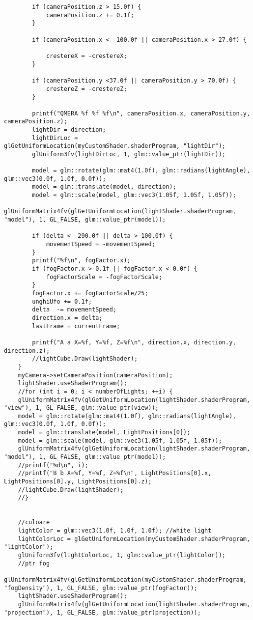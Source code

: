 \begin{itemize}
\begin{verbatim}
		if (cameraPosition.z > 15.0f) {
			cameraPosition.z += 0.1f;
		}
		
		if (cameraPosition.x < -100.0f || cameraPosition.x > 27.0f) {
			
			crestereX = -crestereX;
		}

		if (cameraPosition.y <37.0f || cameraPosition.y > 70.0f) {
			crestereZ = -crestereZ;
		}
		
		printf("QMERA %f %f %f\n", cameraPosition.x, cameraPosition.y, cameraPosition.z);
		lightDir = direction;
		lightDirLoc = glGetUniformLocation(myCustomShader.shaderProgram, "lightDir");
		glUniform3fv(lightDirLoc, 1, glm::value_ptr(lightDir));
	
		model = glm::rotate(glm::mat4(1.0f), glm::radians(lightAngle), glm::vec3(0.0f, 1.0f, 0.0f));
		model = glm::translate(model, direction);
		model = glm::scale(model, glm::vec3(1.05f, 1.05f, 1.05f));
		glUniformMatrix4fv(glGetUniformLocation(lightShader.shaderProgram, "model"), 1, GL_FALSE, glm::value_ptr(model));
		
		if (delta < -290.0f || delta > 100.0f) {
			movementSpeed = -movementSpeed;
		}
		printf("%f\n", fogFactor.x);
		if (fogFactor.x > 0.1f || fogFactor.x < 0.0f) {
			fogFactorScale = -fogFactorScale;
		}
		fogFactor.x += fogFactorScale/25;
		unghiUfo += 0.1f;
		delta  -= movementSpeed;
		direction.x = delta;
		lastFrame = currentFrame;

		printf("A a X=%f, Y=%f, Z=%f\n", direction.x, direction.y, direction.z);
		//lightCube.Draw(lightShader);
	}
	myCamera->setCameraPosition(cameraPosition);
	lightShader.useShaderProgram();
	//for (int i = 0; i < numberOfLights; ++i) {
	glUniformMatrix4fv(glGetUniformLocation(lightShader.shaderProgram, "view"), 1, GL_FALSE, glm::value_ptr(view));
	model = glm::rotate(glm::mat4(1.0f), glm::radians(lightAngle), glm::vec3(0.0f, 1.0f, 0.0f));
	model = glm::translate(model, LightPositions[0]);
	model = glm::scale(model, glm::vec3(1.05f, 1.05f, 1.05f));
	glUniformMatrix4fv(glGetUniformLocation(lightShader.shaderProgram, "model"), 1, GL_FALSE, glm::value_ptr(model));
	//printf("%d\n", i);
	//printf("B b X=%f, Y=%f, Z=%f\n", LightPositions[0].x, LightPositions[0].y, LightPositions[0].z);
	//lightCube.Draw(lightShader);
	//}


	//culoare
	lightColor = glm::vec3(1.0f, 1.0f, 1.0f); //white light
	lightColorLoc = glGetUniformLocation(myCustomShader.shaderProgram, "lightColor");
	glUniform3fv(lightColorLoc, 1, glm::value_ptr(lightColor));
	//ptr fog
	glUniformMatrix4fv(glGetUniformLocation(myCustomShader.shaderProgram, "fogDensity"), 1, GL_FALSE, glm::value_ptr(fogFactor));
	lightShader.useShaderProgram();
	glUniformMatrix4fv(glGetUniformLocation(lightShader.shaderProgram, "projection"), 1, GL_FALSE, glm::value_ptr(projection));



\end{verbatim}
\end{itemize}
